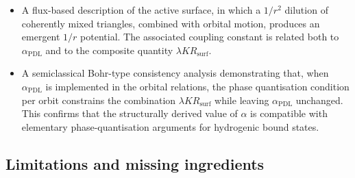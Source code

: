 \documentclass[11pt,a4paper]{article}
\begin{document}
\begin{itemize}
\item A flux-based description of the active surface, in which a $1/r^{2}$ dilution of coherently mixed triangles, combined with orbital motion, produces an emergent $1/r$ potential. The associated coupling constant is related both to $\alpha_{\mathrm{PDL}}$ and to the composite quantity $\lambda K R_{\mathrm{surf}}$.
\item A semiclassical Bohr-type consistency analysis demonstrating that, when $\alpha_{\mathrm{PDL}}$ is implemented in the orbital relations, the phase quantisation condition per orbit constrains the combination $\lambda K R_{\mathrm{surf}}$ while leaving $\alpha_{\mathrm{PDL}}$ unchanged. This confirms that the structurally derived value of $\alpha$ is compatible with elementary phase-quantisation arguments for hydrogenic bound states.
\end{itemize}

\subsection{Limitations and missing ingredients}
\end{document}
